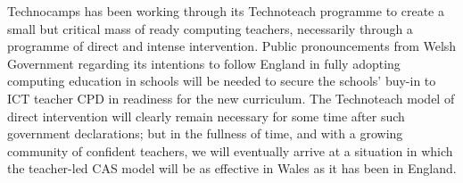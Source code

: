 \documentclass{sig-alternate}
\begin{document}
Technocamps has been working through its Technoteach programme to
create a small but critical mass of ready computing teachers,
necessarily through a programme of direct and intense intervention.
Public pronouncements from Welsh Government regarding its intentions
to follow England in fully adopting computing education in schools
will be needed to secure the schools' buy-in to ICT teacher CPD in
readiness for the new curriculum.  The Technoteach model of direct
intervention will clearly remain necessary for some time after such
government declarations; but in the fullness of time, and with a
growing community of confident teachers, we will eventually arrive at
a situation in which the teacher-led CAS model will be as effective in
Wales as it has been in England.



\end{document}
